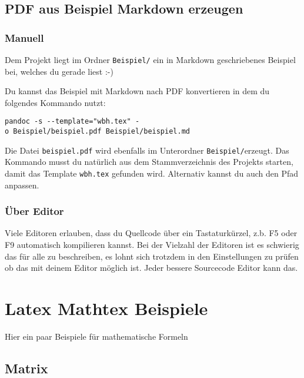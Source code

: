 \documentclass[
    12pt,
    a4paper,
            ngerman,
        bibliography=totocnumbered,
    listof=totocnumbered
]{scrartcl}
\begin{document}
\hypertarget{pdf-aus-beispiel-markdown-erzeugen}{%
\subsection{PDF aus Beispiel Markdown
erzeugen}\label{pdf-aus-beispiel-markdown-erzeugen}}

\hypertarget{manuell}{%
\subsubsection{Manuell}\label{manuell}}

Dem Projekt liegt im Ordner \texttt{Beispiel/} ein in Markdown
geschriebenes Beispiel bei, welches du gerade liest :-)

Du kannst das Beispiel mit Markdown nach PDF konvertieren in dem du
folgendes Kommando nutzt:

\texttt{pandoc\ -s\ -\/-template="wbh.tex"\ -o\ Beispiel/beispiel.pdf\ Beispiel/beispiel.md}

Die Datei \texttt{beispiel.pdf} wird ebenfalls im Unterordner
\texttt{Beispiel/}erzeugt. Das Kommando musst du natürlich aus dem
Stammverzeichnis des Projekts starten, damit das Template
\texttt{wbh.tex} gefunden wird. Alternativ kannst du auch den Pfad
anpassen.

\hypertarget{uxfcber-editor}{%
\subsubsection{Über Editor}\label{uxfcber-editor}}

Viele Editoren erlauben, dass du Quellcode über ein Tastaturkürzel, z.b.
F5 oder F9 automatisch kompilieren kannst. Bei der Vielzahl der Editoren
ist es schwierig das für alle zu beschreiben, es lohnt sich trotzdem in
den Einstellungen zu prüfen ob das mit deinem Editor möglich ist. Jeder
bessere Sourcecode Editor kann das.

\hypertarget{latex-mathtex-beispiele}{%
\section{Latex Mathtex Beispiele}\label{latex-mathtex-beispiele}}

Hier ein paar Beispiele für mathematische Formeln

\hypertarget{matrix}{%
\subsection{Matrix}\label{matrix}}
\end{document}
